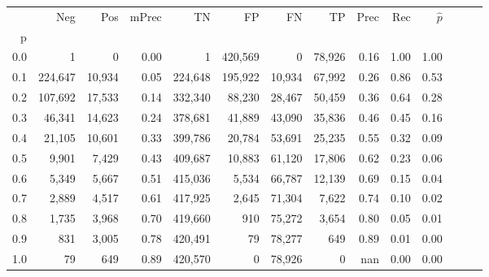 \begin{tabular}{rrrrrrrrrrrrrr}
\toprule
{} &      Neg &     Pos & mPrec &       TN &       FP &      FN &      TP &  Prec &   Rec & $\hat{p}$ \\
p   &          &         &       &          &          &         &         &       &       &           \\
\midrule
0.0 &        1 &       0 &  0.00 &        1 &  420,569 &       0 &  78,926 &  0.16 &  1.00 &      1.00 \\
0.1 &  224,647 &  10,934 &  0.05 &  224,648 &  195,922 &  10,934 &  67,992 &  0.26 &  0.86 &      0.53 \\
0.2 &  107,692 &  17,533 &  0.14 &  332,340 &   88,230 &  28,467 &  50,459 &  0.36 &  0.64 &      0.28 \\
0.3 &   46,341 &  14,623 &  0.24 &  378,681 &   41,889 &  43,090 &  35,836 &  0.46 &  0.45 &      0.16 \\
0.4 &   21,105 &  10,601 &  0.33 &  399,786 &   20,784 &  53,691 &  25,235 &  0.55 &  0.32 &      0.09 \\
0.5 &    9,901 &   7,429 &  0.43 &  409,687 &   10,883 &  61,120 &  17,806 &  0.62 &  0.23 &      0.06 \\
0.6 &    5,349 &   5,667 &  0.51 &  415,036 &    5,534 &  66,787 &  12,139 &  0.69 &  0.15 &      0.04 \\
0.7 &    2,889 &   4,517 &  0.61 &  417,925 &    2,645 &  71,304 &   7,622 &  0.74 &  0.10 &      0.02 \\
0.8 &    1,735 &   3,968 &  0.70 &  419,660 &      910 &  75,272 &   3,654 &  0.80 &  0.05 &      0.01 \\
0.9 &      831 &   3,005 &  0.78 &  420,491 &       79 &  78,277 &     649 &  0.89 &  0.01 &      0.00 \\
1.0 &       79 &     649 &  0.89 &  420,570 &        0 &  78,926 &       0 &   nan &  0.00 &      0.00 \\
\bottomrule
\end{tabular}
